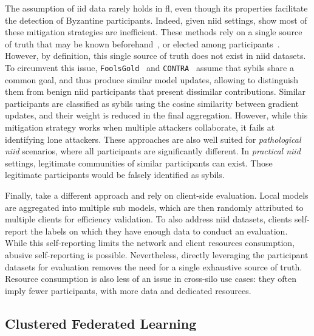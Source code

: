 The assumption of \gls{iid} data rarely holds in \gls{fl}, even though its properties facilitate the detection of Byzantine participants.
Indeed, given \gls{niid} settings, \textcite{you_Poisoningattackdetection_2022} show most of these mitigation strategies are inefficient.
These methods rely on a single source of truth that may be known beforehand~\cite{cao_FLTrustByzantinerobustFederated_2022}, or elected among participants~\cite{blanchard_Machinelearningadversaries_2017}.
However, by definition, this single source of truth does not exist in \gls{niid} datasets. 
To circumvent this issue, \texttt{FoolsGold}~\cite{fung_LimitationsFederatedLearning_2020} and \texttt{CONTRA}~\cite{awan_CONTRADefendingPoisoning_2021} assume that sybils share a common goal, and thus produce similar model updates, allowing to distinguish them from benign \gls{niid} participants that present dissimilar contributions. 
Similar participants are classified as sybils using the cosine similarity between gradient updates, and their weight is reduced in the final aggregation. 
However, while this mitigation strategy works when multiple attackers collaborate, it fails at identifying lone attackers.
These approaches are also well suited for \emph{pathological \gls{niid}} scenarios, where all participants are significantly different. 
In \emph{practical \gls{niid}} settings, legitimate communities of similar participants can exist.
Those legitimate participants would be falsely identified as sybils. 

Finally, \textcite{zhao_ShieldingCollaborativeLearning_2020} take a different approach and rely on client-side evaluation.  
Local models are aggregated into multiple sub models, which are then randomly attributed to multiple clients for efficiency validation. 
To also address \gls{niid} datasets, clients self-report the labels on which they have enough data to conduct an evaluation. 
While this self-reporting limits the network and client resources consumption, abusive self-reporting is possible. 
Nevertheless, directly leveraging the participant datasets for evaluation removes the need for a single exhaustive source of truth. 
Resource consumption is also less of an issue in cross-silo use cases: they often imply fewer participants, with more data and dedicated resources.


\subsection{Clustered Federated Learning\label{sec:radar.related.cluster}}

